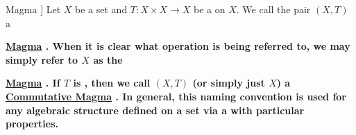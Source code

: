 \label{def:Magma}
\newcommand{\Magma}[0]{
    \bf \hyperref[def:Magma]{Magma} \rm
}
\newcommand{\Magmas}[0]{
    \bf \hyperref[def:Magma]{Magmas} \rm
}
\newcommand{\CommutativeMagma}[0]{
    \bf \hyperref[def:Magma]{Commutative Magma} \rm
}
\newcommand{\CommutativeMagmas}[0]{
    \bf \hyperref[def:Magma]{Commutative Magmas} \rm
}

\begin{df}[\Magma]
    Let $X$ be a set and
    $T:X \times X \to X$ be a 
    \BinaryOperation
    on $X$. 
    We call the pair $(X,T)$ a 
    \Magma.
    When it is clear what operation is being referred to, 
    we may simply refer to $X$
    as the 
    \Magma.
	If 
	$T$
	is
	\CommutativeFunction, 
	then we call 
	$(X,T)$ (or simply just $X$)
	a \CommutativeMagma.
	In general, this naming convention is used 
	for any algebraic structure defined on a set 
	via a \BinaryOperation with
	particular properties. 
\end{df}
